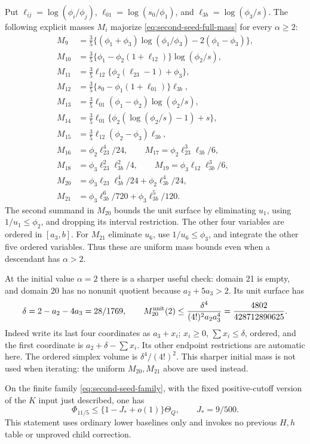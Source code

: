 Put $\ell_{ij}=\log(\phi_i/\phi_j)$,
$\ell_{01}=\log(s_0/\phi_1)$, and
$\ell_{3b}=\log(\phi_3/s)$.
The following explicit masses $M_i$ majorize
\eqref{eq:second-seed-full-mass} for every $\alpha\ge2$:
\begin{align*}
 M_9&=\tfrac35\{(\phi_1+\phi_3)\log(\phi_1/\phi_3)-2(\phi_1-\phi_3)\},\\
 M_{10}&=\tfrac35\{\phi_1-\phi_2(1+\ell_{12})\}\log(\phi_2/s),\\
 M_{11}&=\tfrac35\ell_{12}\{\phi_2(\ell_{23}-1)+\phi_3\},\\
 M_{12}&=\tfrac35\{s_0-\phi_1(1+\ell_{01})\}\ell_{3b},\\
 M_{13}&=\tfrac35\ell_{01}(\phi_1-\phi_2)\log(\phi_2/s),\\
 M_{14}&=\tfrac35\ell_{01}\{\phi_2(\log(\phi_2/s)-1)+s\},\\
 M_{15}&=\tfrac35\ell_{12}(\phi_2-\phi_3)\ell_{3b},\\
 M_{16}&=\phi_2\ell_{23}^4/24,\qquad
 M_{17}=\phi_2\ell_{23}^3\ell_{3b}/6,\\
 M_{18}&=\phi_3\ell_{23}^2\ell_{3b}^2/4,\qquad
 M_{19}=\phi_3\ell_{12}\ell_{3b}^3/6,\\
 M_{20}&=\phi_3\ell_{23}\ell_{3b}^4/24
                         +\phi_2\ell_{3b}^4/24,\\
 M_{21}&=\phi_3\ell_{3b}^6/720+\phi_3\ell_{3b}^5/120.
\end{align*}
The second summand in $M_{20}$ bounds the unit surface by eliminating
$u_1$, using $1/u_1\le\phi_2$, and dropping its interval restriction.
The other four variables are ordered in $[a_3,b]$.
For $M_{21}$ eliminate $u_6$, use $1/u_6\le\phi_3$, and integrate
the other five ordered variables.  Thus these are uniform mass bounds
even when a descendant has $\alpha>2$.

At the initial value $\alpha=2$ there is a sharper useful check:
domain 21 is empty, and domain 20 has no nonunit quotient because
$a_2+5a_3>2$.  Its unit surface has
\[
 \delta=2-a_2-4a_3=28/1769,\qquad
 M_{20}^{\rm unit}(2)\le
 \frac{\delta^4}{(4!)^2a_2a_3^4}
 =\frac{4802}{428712890625}.
\]
Indeed write its last four coordinates as $a_3+x_i$;
$x_i\ge0$, $\sum x_i\le\delta$, ordered, and the first coordinate
is $a_2+\delta-\sum x_i$.  Its other endpoint restrictions are
automatic here.  The ordered simplex volume is $\delta^4/(4!)^2$.
This sharper initial mass is not used when iterating: the uniform
$M_{20},M_{21}$ above are used instead.

\begin{proposition}
\label{prop:replacement-second-seed}
On the finite family \eqref{eq:second-seed-family}, with the fixed
positive-cutoff version of the $K$ input just described, one has
\[
 \Phi_{11/5}\le\{1-J_*+o(1)\}\Theta_Q,
 \qquad J_*=9/500.
\]
This statement uses ordinary lower baselines only and invokes no
previous $H,h$ table or unproved child correction.
\end{proposition}

